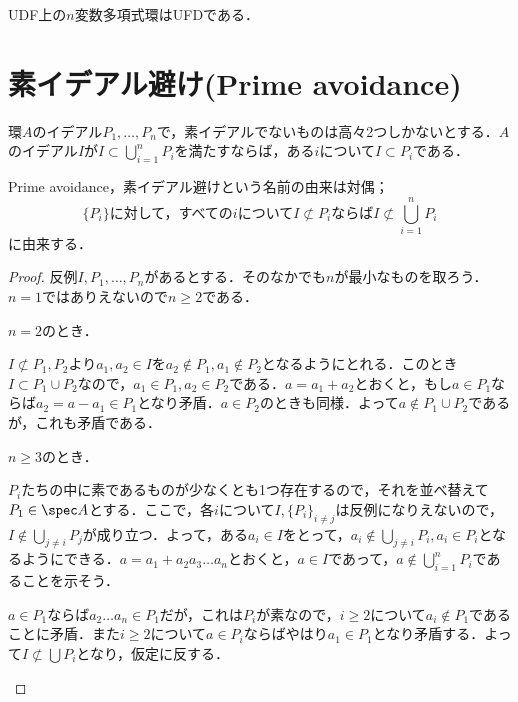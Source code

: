 \begin{cor}\label{cor:多変数もUFD}
	UDF上の$n$変数多項式環はUFDである．
\end{cor}


\section{素イデアル避け(Prime avoidance)}

\begin{lem}\label{lem:Prime avoidance}
	環$A$のイデアル$P_1,\dots, P_n$で，素イデアルでないものは高々2つしかないとする．$A$のイデアル$I$が$I\subset\bigcup_{i=1}^n P_i$を満たすならば，ある$i$について$I\subset P_i$である．
\end{lem}

Prime avoidance，素イデアル避けという名前の由来は対偶；
\[\{P_i\}\text{に対して，すべての}i\text{について}I\not\subset P_i\text{ならば}I\not\subset\bigcup_{i=1}^n P_i\]
に由来する．
\begin{proof}
	反例$I,P_1,\dots, P_n$があるとする．そのなかでも$n$が最小なものを取ろう．$n=1$ではありえないので$n\geq 2$である．
	
	\begin{sakura}
		\item $n=2$のとき．
		
		$I\not\subset P_1,P_2$より$a_1,a_2\in I$を$a_2\not\in P_1,a_1\not\in P_2$となるようにとれる．このとき$I\subset P_1\cup P_2$なので，$a_1\in P_1,a_2\in P_2$である．$a=a_1+a_2$とおくと，もし$a\in P_1$ならば$a_2=a-a_1\in P_1$となり矛盾．$a\in P_2$のときも同様．よって$a\not\in P_1\cup P_2$であるが，これも矛盾である．
		
		\item $n\geq3$のとき．
		
		$P_i$たちの中に素であるものが少なくとも1つ存在するので，それを並べ替えて$P_1\in\spec A$とする．ここで，各$i$について$I,\{P_i\}_{i\neq j}$は反例になりえないので，$I\not\in\bigcup_{j\neq i}P_j$が成り立つ．よって，ある$a_i\in I$をとって，$a_i\not\in\bigcup_{j\neq i}P_i,a_i\in P_i$となるようにできる．$a=a_1+a_2a_3\dots a_n$とおくと，$a\in I$であって，$a\not\in\bigcup_{i=1}^n P_i$であることを示そう．
		
		$a\in P_1$ならば$a_2\dots a_n\in P_1$だが，これは$P_i$が素なので，$i\geq2$について$a_i\not\in P_1$であることに矛盾．また$i\geq2$について$a\in P_i$ならばやはり$a_1\in P_1$となり矛盾する．よって$I\not\subset\bigcup P_i$となり，仮定に反する．
	\end{sakura}
\end{proof}


